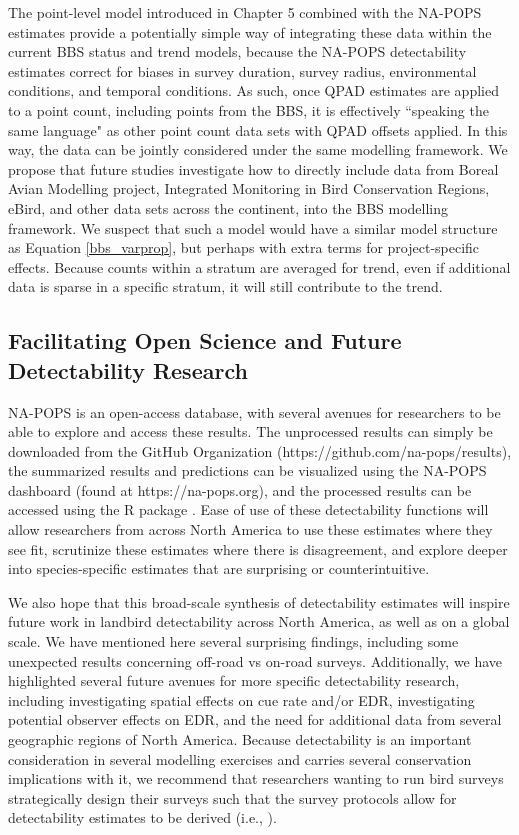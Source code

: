 The point-level model introduced in Chapter 5 combined with the NA-POPS estimates provide a potentially simple way of integrating these data within the current BBS status and trend models, because the NA-POPS detectability estimates correct for biases in survey duration, survey radius, environmental conditions, and temporal conditions.
As such, once QPAD \citep{solymos_calibrating_2013} estimates are applied to a point count, including points from the BBS, it is effectively ``speaking the same language" as other point count data sets with QPAD offsets applied.
In this way, the data can be jointly considered under the same modelling framework.
We propose that future studies investigate how to directly include data from Boreal Avian Modelling project, Integrated Monitoring in Bird Conservation Regions, eBird, and other data sets across the continent, into the BBS modelling framework.
We suspect that such a model would have a similar model structure as Equation \ref{bbs_varprop}, but perhaps with extra terms for project-specific effects.
Because counts within a stratum are averaged for trend, even if additional data is sparse in a specific stratum, it will still contribute to the trend.

\subsection{Facilitating Open Science and Future Detectability Research}

\par NA-POPS is an open-access database, with several avenues for researchers to be able to explore and access these results. The unprocessed results can simply be downloaded from the GitHub Organization (https://github.com/na-pops/results), the summarized results and predictions can be visualized using the NA-POPS dashboard (found at https://na-pops.org), and the processed results can be accessed using the R package  \citep{edwards_napops_2024}. Ease of use of these detectability functions will allow researchers from across North America to use these estimates where they see fit, scrutinize these estimates where there is disagreement, and explore deeper into species-specific estimates that are surprising or counterintuitive.

\par We also hope that this broad-scale synthesis of detectability estimates will inspire future work in landbird detectability across North America, as well as on a global scale. We have mentioned here several surprising findings, including some unexpected results concerning off-road vs on-road surveys. Additionally, we have highlighted several future avenues for more specific detectability research, including investigating spatial effects on cue rate and/or EDR, investigating potential observer effects on EDR, and the need for additional data from several geographic regions of North America. Because detectability is an important consideration in several modelling exercises and carries several conservation implications with it, we recommend that researchers wanting to run bird surveys strategically design their surveys such that the survey protocols allow for detectability estimates to be derived (i.e., \citet{matsuoka_reviving_2014}). 

